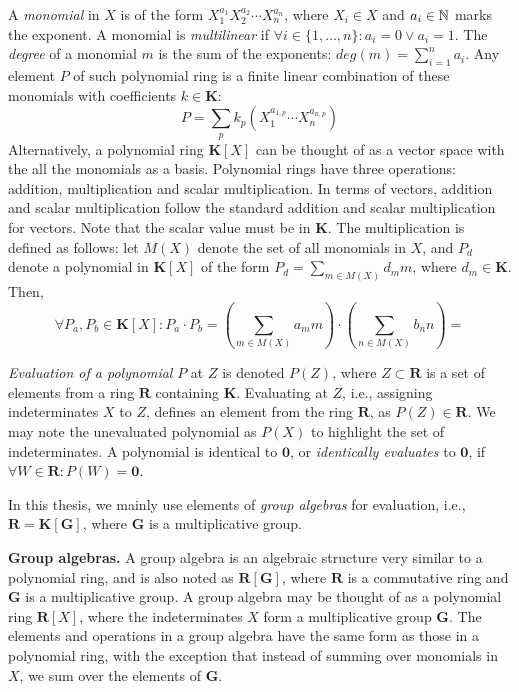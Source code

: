 A \emph{monomial} in $X$ is of the form 
$X_1^{a_1}X_2^{a_2}\cdots X_n^{a_n}$, where $X_i \in X$ and $a_i \in \mathbb N$ marks the exponent. 
A monomial is \emph{multilinear} if 
$\forall i \in \{1, \ldots, n\} \colon a_i = 0 \vee a_i = 1$. 
The \emph{degree} of a monomial $m$ 
is the sum of the exponents: $deg(m) = \sum_{i=1}^n a_i$. 
Any element $P$ of such polynomial ring is a finite linear combination of these monomials 
with coefficients $k \in \mathbf{K}$: 
\[
  P = \displaystyle \sum_p k_p(X_1^{a_{1,p}} \cdots X_n^{a_{n,p}})
\] 
Alternatively, a polynomial ring $\mathbf{K}[X]$ can be thought of as a vector space with 
the all the monomials as a basis. 
Polynomial rings have three operations: addition, multiplication 
and scalar multiplication. In terms of vectors, addition and scalar multiplication follow 
the standard addition and scalar multiplication for vectors. 
Note that the scalar value must be in $\mathbf{K}$. 
The multiplication is defined as follows: 
let $M(X)$ denote the set of all monomials in $X$, and 
$P_d$ denote a polynomial in $\mathbf{K}[X]$ of the form $P_d = \sum_{m \in M(X)} d_m m$, 
where $d_m \in \mathbf{K}$. Then, 
\[
  \forall P_a,P_b \in \mathbf{K}[X] \colon P_a \cdot P_b = (\displaystyle \sum_{m \in M(X)} a_m m)
  \cdot (\displaystyle \sum_{n \in M(X)} b_n n) = 
\]

\emph{Evaluation of a polynomial} $P$ at $Z$ is denoted $P(Z)$, where 
$Z \subset \mathbf{R}$ is a set of elements from a ring $\mathbf{R}$ containing $\mathbf{K}$. 
Evaluating at $Z$, i.e., assigning indeterminates $X$ to $Z$, defines an 
element from the ring $\mathbf{R}$, as $P(Z) \in \mathbf{R}$. We may note the unevaluated 
polynomial as $P(X)$ to highlight the set of indeterminates. 
A polynomial is identical to $\mathbf{0}$, or \emph{identically 
evaluates} to $\mathbf{0}$, if $\forall W \in \mathbf{R} \colon P(W) = \mathbf{0}$.

In this thesis, we mainly use elements of \emph{group algebras} 
for evaluation, i.e., $\mathbf{R} = \mathbf{K}[\mathbf{G}]$, where $\mathbf{G}$ is a 
multiplicative group.

\textbf{Group algebras.} A group algebra is an algebraic structure 
very similar to a polynomial ring, and 
is also noted as $\mathbf{R}[\mathbf{G}]$, where $\mathbf{R}$ is a commutative ring and 
$\mathbf{G}$ is a multiplicative group. A group algebra may be thought of as a 
polynomial ring $\mathbf{R}[X]$, where the indeterminates $X$ form a multiplicative group $\mathbf{G}$. 
The elements and operations in a group algebra have the same form as those in a polynomial ring, 
with the exception that instead of summing over monomials in $X$, 
we sum over the elements of $\mathbf{G}$.


